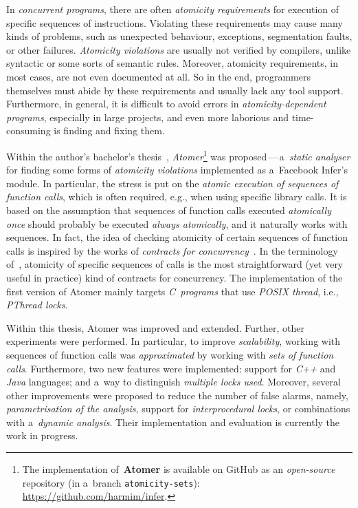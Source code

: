 In \emph{concurrent programs}, there are often \emph{atomicity requirements} for execution of specific sequences of instructions. Violating these requirements may cause many kinds of problems, such as unexpected behaviour, exceptions, segmentation faults, or other failures. \emph{Atomicity violations} are usually not verified by compilers, unlike syntactic or some sorts of semantic rules. Moreover, atomicity requirements, in most cases, are not even documented at all. So in the end, programmers themselves must abide by these requirements and usually lack any tool support. Furthermore, in general, it is difficult to avoid errors in \emph{atomicity-dependent programs}, especially in large projects, and even more laborious and time-consuming is finding and fixing them.

Within the author's bachelor's thesis~\cite{harmimBP}, \emph{Atomer}\footnote{The implementation of~\textbf{Atomer} is available on GitHub as an \emph{open-source} repository (in a~branch \texttt{atomicity-sets}): \url{https://github.com/harmim/infer}.} was proposed\,---\,a~\emph{static analyser} for finding some forms of \emph{atomicity violations} implemented as a~Facebook Infer's module. In particular, the stress is put on the \emph{atomic execution of sequences of function calls}, which is often required, e.g., when using specific library calls. It is based on the assumption that sequences of function calls executed \emph{atomically once} should probably be executed \emph{always atomically}, and it naturally works with sequences. In fact, the idea of checking atomicity of certain sequences of function calls is inspired by the works of \emph{contracts for concurrency}~\cite{contracts2017, contracts2015}. In the terminology of~\cite{contracts2017, contracts2015}, atomicity of specific sequences of calls is the most straightforward (yet very useful in practice) kind of contracts for concurrency. The implementation of the first version of Atomer mainly targets \emph{C~programs} that use \emph{POSIX thread}, i.e., \emph{PThread locks}.

Within this thesis, Atomer was improved and extended. Further, other experiments were performed. In particular, to improve \emph{scalability}, working with sequences of function calls was \emph{approximated} by working with \emph{sets of function calls}. Furthermore, two new features were implemented: support for \emph{C++} and \emph{Java} languages; and a~way to distinguish \emph{multiple locks used}. Moreover, several other improvements were proposed to reduce the number of false alarms, namely, \emph{parametrisation of the analysis}, support for \emph{interprocedural locks}, or combinations with a~\emph{dynamic analysis}. Their implementation and evaluation is currently the work in progress.

